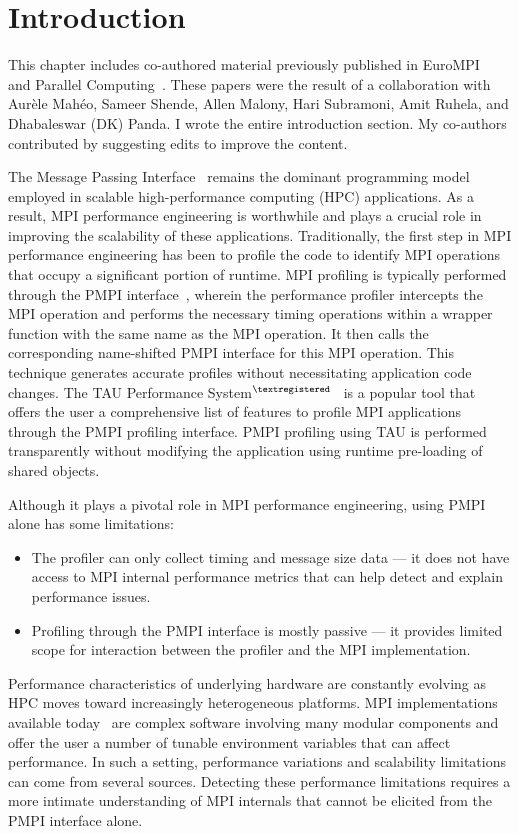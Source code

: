 \chapter{Introduction}
This chapter includes co-authored material previously published in EuroMPI~\cite{EuroMPI} and Parallel Computing~\cite{ParCo}. These papers were the result of a collaboration with Aur\`{e}le Mah\'{e}o, Sameer Shende, Allen Malony, Hari Subramoni, Amit Ruhela, and Dhabaleswar (DK) Panda. I wrote the entire introduction section. My co-authors contributed by suggesting edits to improve the content. 
\par The Message Passing Interface~\cite{MPI_3_1} remains the dominant programming model employed in scalable high-performance computing (HPC) applications. As a result, MPI performance engineering is worthwhile and plays a crucial role in improving the scalability of these applications. Traditionally, the first step in MPI performance engineering has been to profile the code to identify MPI operations that occupy a significant portion of runtime. MPI profiling is typically performed through the PMPI interface~\cite{PMPI}, wherein the performance profiler intercepts the MPI operation and performs the necessary timing operations within a wrapper function with the same name as the MPI operation. It then calls the corresponding name-shifted PMPI interface for this MPI operation. This technique generates accurate profiles without necessitating application code changes. The TAU Performance System$^{\textregistered}$~\cite{Shende:2006:TPP:1125980.1125982} is a popular tool that offers the user a comprehensive list of features to profile MPI applications through the PMPI profiling interface. PMPI profiling using TAU is performed transparently without modifying the application using runtime pre-loading of shared objects. \par
Although it plays a pivotal role in MPI performance engineering, using PMPI alone has some limitations:
\begin{itemize}
\item The profiler can only collect timing and message size data --- it does not have access to MPI internal performance metrics that can help detect and explain performance issues.
\item Profiling through the PMPI interface is mostly passive --- it provides limited scope for interaction between the profiler and the MPI implementation.
\end{itemize}
\par Performance characteristics of underlying hardware are constantly evolving as HPC moves toward increasingly heterogeneous platforms. MPI implementations available today~\cite{MVAPICH2,OpenMPI,MPICH,pjn2008} are complex software involving many modular components and offer the user a number of tunable environment variables that can affect performance. In such a setting, performance variations and scalability limitations can come from several sources. Detecting these performance limitations requires a more intimate understanding of MPI internals that cannot be elicited from the PMPI interface alone. \par
